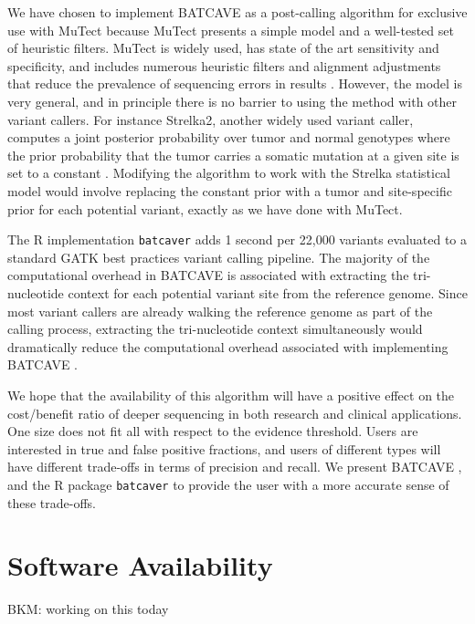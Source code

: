 \documentclass[a4,center,fleqn]{NAR}
\newcommand{\bkmcomment}[1]{{\color{blue}BKM: #1}}
\newcommand{\batcave}{BATCAVE }
\begin{document}
We have chosen to implement \batcave as a post-calling algorithm for exclusive use with MuTect because MuTect presents a simple model and a well-tested set of heuristic filters.
MuTect is widely used, has state of the art sensitivity and specificity, and includes numerous heuristic filters and alignment adjustments that reduce the prevalence of sequencing errors in results \cite{Griffith2015}.
However, the model is very general, and in principle there is no barrier to using the method with other variant callers.
For instance Strelka2, another widely used variant caller, computes a joint posterior probability over tumor and normal genotypes where the prior probability that the tumor carries a somatic mutation at a given site is set to a constant \cite{Kim2018}.
Modifying the algorithm to work with the Strelka statistical model would involve replacing the constant prior with a tumor and site-specific prior for each potential variant, exactly as we have done with MuTect.

The R implementation \texttt{batcaver} adds 1 second per 22,000 variants evaluated to a standard GATK best practices variant calling pipeline. 
The majority of the computational overhead in \batcave is associated with extracting the tri-nucleotide context for each potential variant site from the reference genome.
Since most variant callers are already walking the reference genome as part of the calling process, extracting the tri-nucleotide context simultaneously would dramatically reduce the computational overhead associated with implementing \batcave.

We hope that the availability of this algorithm will have a positive effect on the cost/benefit ratio of deeper sequencing in both research and clinical applications.
One size does not fit all with respect to the evidence threshold. 
Users are interested in true and false positive fractions, and users of different types will have different trade-offs in terms of precision and recall.
We present \batcave, and the R package \texttt{batcaver} to provide the user with a more accurate sense of these trade-offs.


\section{Software Availability}
\bkmcomment{working on this today}
\end{document}
